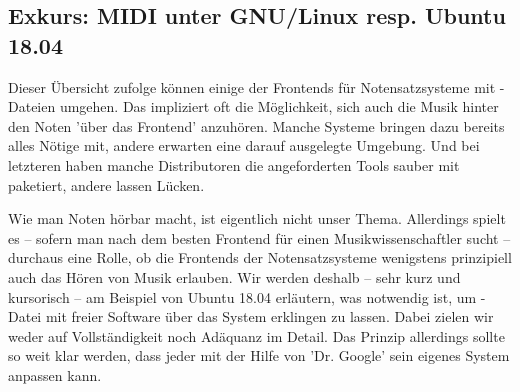 %
%
%


\subsection{Exkurs: MIDI unter GNU/Linux resp. Ubuntu 18.04}

Dieser Übersicht zufolge können einige der Frontends für Notensatzsysteme mit
-Dateien umgehen. Das impliziert oft die Möglichkeit, sich auch die
Musik hinter den Noten 'über das Frontend' anzuhören. Manche Systeme bringen dazu
bereits alles Nötige mit, andere erwarten eine darauf ausgelegte Umgebung. Und
bei letzteren haben manche Distributoren die angeforderten Tools sauber mit
paketiert, andere lassen Lücken.

Wie man Noten hörbar macht, ist eigentlich nicht unser Thema. Allerdings
spielt es -- sofern man nach dem besten Frontend für einen Musikwissenschaftler
sucht -- durchaus eine Rolle, ob die Frontends der Notensatzsysteme wenigstens
prinzipiell auch das Hören von Musik erlauben. Wir werden deshalb -- sehr kurz
und kursorisch -- am Beispiel von Ubuntu 18.04 erläutern, was notwendig ist, um
-Datei mit freier Software über das System erklingen zu lassen. Dabei
zielen wir weder auf Vollständigkeit noch Adäquanz im Detail. Das Prinzip
allerdings sollte so weit klar werden, dass jeder mit der Hilfe von 'Dr. Google'
sein eigenes System anpassen kann.

